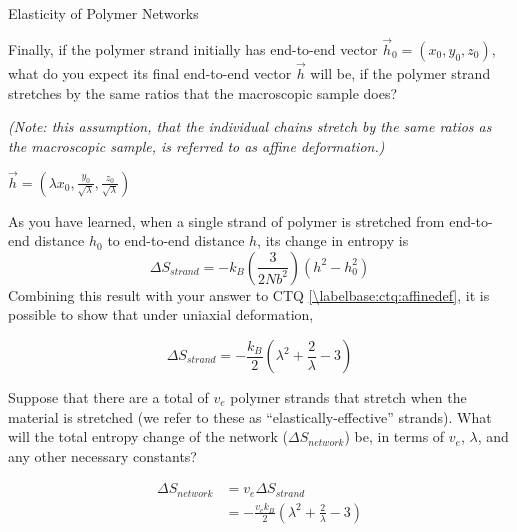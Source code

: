 \begin{activity}{Elasticity of Polymer Networks}
\begin{ctqs}
\begin{enumerate}
			\end{enumerate}
	
	\question Finally, if the polymer strand initially has end-to-end vector $\vec h_0 = (x_0, y_0, z_0)$, what do you expect its final end-to-end vector $\vec h$ will be, if the polymer strand stretches by the same ratios that the macroscopic sample does?  \label{\labelbase:ctq:affinedef}
			
			\emph{(Note: this assumption, that the individual chains stretch by the same ratios as the macroscopic sample, is referred to as \emph{affine deformation}.)}
		
			\begin{solution}[0.75in]
				$\vec h = (\lambda x_0, \frac{y_0}{\sqrt{\lambda}}, \frac{z_0}{\sqrt{\lambda}})$
			\end{solution}
				
\end{ctqs}

\begin{infobox}

	As you have learned, when a single strand of polymer is stretched from end-to-end distance $h_0$ to end-to-end distance $h$, its change in entropy is 
			\begin{equation*}
				\Delta S_{strand} = -k_B\left(\frac{3}{2Nb^2}\right)(h^2 - h_0^2)
			\end{equation*}
	Combining this result with your answer to CTQ \ref{\labelbase:ctq:affinedef}, it is possible to show that under uniaxial deformation,
	
		\begin{equation*}	
				\Delta S_{strand} = -\frac{k_B}{2}\left(\lambda^2 + \frac{2}{\lambda} - 3\right)
			\label{\labelbase:eqn:delSstranduniaxial}
		\end{equation*}
			
\end{infobox}

\begin{ctqs}
		
	\question Suppose that there are a total of $v_e$ polymer strands that stretch when the material is stretched (we refer to these as ``elastically-effective'' strands). What will the total entropy change of the network ($\Delta S_{network}$) be, in terms of $v_e$, $\lambda$, and any other necessary constants?
		
			\begin{solution}[1.25in]
				\begin{align*}
					\Delta S_{network} &= v_e \Delta S_{strand}\\
						&= -\frac{v_e k_B}{2}\left(\lambda^2 + \frac{2}{\lambda} - 3\right)
				\end{align*}
			\end{solution}
		

\end{ctqs}
\end{activity}
